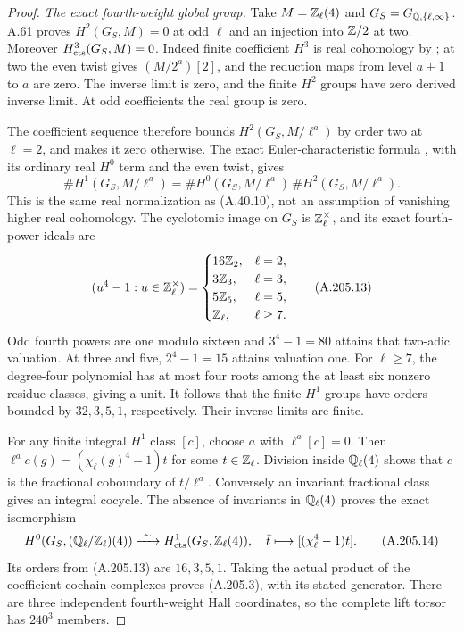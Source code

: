 \begin{proof}
\emph{The exact fourth-weight global group.}
Take \(M=\mathbb Z_\ell(4)\) and \(G_S=G_{\mathbb Q,\{\ell,\infty\}}\).
A.61 proves \(H^2(G_S,M)=0\) at odd \(\ell\) and an
injection into \(\mathbb Z/2\) at two.  Moreover
\(H^3_{\rm cts}(G_S,M)=0\).
Indeed finite coefficient \(H^3\) is real cohomology by
\cite[I, Theorem 4.10(c)]{BIR_MilneADT}; at two the even
twist gives \((M/2^a)[2]\), and the reduction maps from
level \(a+1\) to \(a\) are zero.  The inverse limit is
zero, and the finite \(H^2\) groups have zero derived
inverse limit.  At odd coefficients the real group is zero.

The coefficient sequence therefore bounds
\(H^2(G_S,M/\ell^a)\) by order two at \(\ell=2\), and
makes it zero otherwise.  The exact Euler-characteristic
formula \cite[I, Theorem 5.1]{BIR_MilneADT}, with its
ordinary real \(H^0\) term and the even twist, gives
\[
 \#H^1(G_S,M/\ell^a)=
       \#H^0(G_S,M/\ell^a)\,\#H^2(G_S,M/\ell^a).
\tag{A.205.12}
\]
This is the same real normalization as (A.40.10), not
an assumption of vanishing higher real cohomology.
The cyclotomic image on \(G_S\) is \(\mathbb Z_\ell^\times\),
and its exact fourth-power ideals are
\[
 (u^4-1:u\in\mathbb Z_\ell^\times)=
 \begin{cases}
 16\mathbb Z_2,&\ell=2,\\
 3\mathbb Z_3,&\ell=3,\\
 5\mathbb Z_5,&\ell=5,\\
 \mathbb Z_\ell,&\ell\geq7.
 \end{cases}
\tag{A.205.13}
\]
Odd fourth powers are one modulo sixteen and \(3^4-1=80\)
attains that two-adic valuation.  At three and five,
\(2^4-1=15\) attains valuation one.  For \(\ell\geq7\),
the degree-four polynomial has at most four roots among
the at least six nonzero residue classes, giving a unit.
It follows that the finite \(H^1\) groups have orders
bounded by \(32,3,5,1\), respectively.  Their inverse
limits are finite.

For any finite integral \(H^1\) class \([c]\), choose
\(a\) with \(\ell^a[c]=0\).  Then
\(\ell^ac(g)=(\chi_\ell(g)^4-1)t\) for some
\(t\in\mathbb Z_\ell\).  Division inside \(\mathbb Q_\ell(4)\)
shows that \(c\) is the fractional coboundary of
\(t/\ell^a\).  Conversely an invariant fractional class
gives an integral cocycle.  The absence of invariants in
\(\mathbb Q_\ell(4)\) proves the exact isomorphism
\[
 H^0(G_S,(\mathbb Q_\ell/\mathbb Z_\ell)(4))
   \xrightarrow{\ \sim\ }H^1_{\rm cts}(G_S,\mathbb Z_\ell(4)),
 \quad \bar t\longmapsto[(\chi_\ell^4-1)t].
\tag{A.205.14}
\]
Its orders from (A.205.13) are \(16,3,5,1\).
Taking the actual product of the coefficient cochain
complexes proves (A.205.3), with its stated generator.
There are three independent fourth-weight Hall coordinates,
so the complete lift torsor has \(240^3\) members.


\end{proof}
